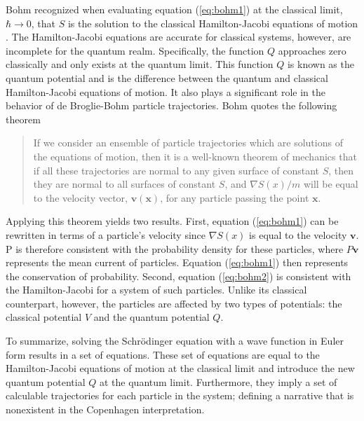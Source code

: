 \documentclass[10pt, reqno]{article}
\begin{document}
  Bohm recognized when evaluating equation (\ref{eq:bohm1}) at the classical limit, $ \hbar \rightarrow 0 $, 
    that $S$ is the solution to the classical Hamilton-Jacobi equations of motion \cite{bohm}.
  The Hamilton-Jacobi equations are accurate for classical systems, however,
    are incomplete for the quantum realm.
  Specifically, the function $Q$ approaches zero classically and only exists at the quantum limit.
  This function $Q$ is known as the quantum potential and is the difference between the quantum and classical Hamilton-Jacobi equations of motion.
  It also plays a significant role in the behavior of de Broglie-Bohm particle trajectories.
  Bohm quotes the following theorem \cite{bohm} 
  \begin{quotation}
    \noindent
    If we consider an ensemble of particle trajectories which are solutions of the equations of motion,
    then it is a well-known theorem of mechanics that if all these trajectories are normal to any given surface of constant $S$,
    then they are normal to all surfaces of constant $S$, 
    and $\nabla S(x) / m $ will be equal to the velocity vector, $\mathbf{v}(\mathbf{x})$,
    for any particle passing the point $ \mathbf{x} $.
  \end{quotation}
  Applying this theorem yields two results.
  First, equation (\ref{eq:bohm1}) can be rewritten in terms of a particle's velocity since $\nabla S(x)$ is equal to the velocity $\mathbf{v}$.
  P is therefore consistent with the probability density for these particles,
    where $P\mathbf{v}$ represents the mean current of particles.
  Equation (\ref{eq:bohm1}) then represents the conservation of probability.
  Second, equation (\ref{eq:bohm2}) is consistent with the Hamilton-Jacobi for a system of such particles.
  Unlike its classical counterpart, however, the particles are affected by two types of potentials: 
    the classical potential $V$ and the quantum potential $Q$.

  To summarize, solving the Schrödinger equation with a wave function in Euler form results in a set of equations.
  These set of equations are equal to the Hamilton-Jacobi equations of motion at the classical limit 
    and introduce the new quantum potential $Q$ at the quantum limit.
  Furthermore, they imply a set of calculable trajectories for each particle in the system;
    defining a narrative that is nonexistent in the Copenhagen interpretation.
\end{document}
